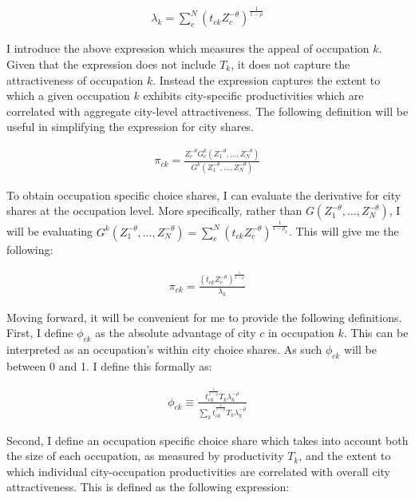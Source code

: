 \documentclass[10pt]{article}
\begin{document}
\begin{align*}
    \lambda_{k} = \sum_{c}^{N} \left( t_{ck} Z_{c}^{-\theta} \right)^{\frac{1}{1-\rho}}
\end{align*}

I introduce the above expression which measures the appeal of occupation $k$. Given that the expression does not include $T_k$, it does not capture the attractiveness of occupation $k$. Instead the expression captures the extent to which a given occupation $k$ exhibits city-specific productivities which are correlated with aggregate city-level attractiveness. The following definition will be useful in simplifying the expression for city shares.

\begin{align*}
    \pi_{ck} = \frac{Z_c^{- \theta} G_c^k(Z_1^{- \theta}, \dots, Z_N^{- \theta})}{G^k(Z_1^{- \theta}, \dots, Z_N^{- \theta})}
\end{align*}

To obtain occupation specific choice shares, I can evaluate the derivative for city shares at the occupation level. More specifically, rather than $G(Z_1^{- \theta}, \dots, Z_N^{- \theta})$, I will be evaluating $G^k(Z_1^{- \theta}, \dots, Z_N^{- \theta}) = \sum_{c}^{N} (t_{ck} Z_c^{- \theta})^{\frac{1}{1 - \rho_k}}$. This will give me the following:

\begin{align}
    \pi_{ck} = \frac{(t_{ck} Z_c^{-\theta})^{\frac{1}{1 - \rho}}}{\lambda_k}
    \label{city_occuaption_shares}
\end{align}

Moving forward, it will be convenient for me to provide the following definitions. First, I define $\phi_{ck}$ as the absolute advantage of city $c$ in occupation $k$. This can be interpreted as an occupation's within city choice shares. As such $\phi_{ck}$ will be between 0 and 1. I define this formally as:

\begin{align}
    \phi_{ck} \equiv \frac{{t^{\frac{1}{1-\rho}}_{ck}}{T_{k}}\lambda_{k}^{-\rho}}{\sum\limits_{k}{t^{\frac{1}{1-\rho}}_{ck}}{T_{k}}\lambda_{k}^{-\rho}}
    \label{occupation_by_city_shares}
\end{align}

Second, I define an occupation specific choice share which takes into account both the size of each occupation, as measured by productivity $T_k$, and the extent to which individual city-occupation productivities are correlated with overall city attractiveness. This is defined as the following expression:
\end{document}
